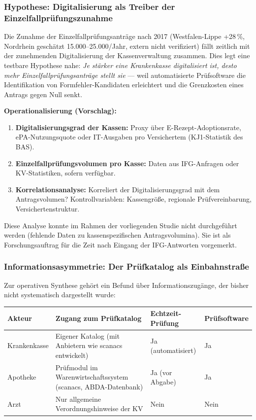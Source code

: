 \documentclass{umbruch-position}
\begin{document}
\subsubsection{Hypothese: Digitalisierung als Treiber der Einzelfallprüfungszunahme}

Die Zunahme der Einzelfallpr\"ufungsantr\"age nach 2017 (Westfalen-Lippe +28\,\%, Nordrhein gesch\"atzt 15.000--25.000/Jahr, extern nicht verifiziert) fällt zeitlich mit der zunehmenden Digitalisierung der Kassenverwaltung zusammen. Dies legt eine testbare Hypothese nahe: \textit{Je stärker eine Krankenkasse digitalisiert ist, desto mehr Einzelfallprüfungsanträge stellt sie} --- weil automatisierte Prüfsoftware die Identifikation von Formfehler-Kandidaten erleichtert und die Grenzkosten eines Antrags gegen Null senkt.

\textbf{Operationalisierung (Vorschlag):}
\begin{enumerate}[nosep]
  \item \textbf{Digitalisierungsgrad der Kassen:} Proxy über E-Rezept-Adoptionsrate, ePA-Nutzungsquote oder IT-Ausgaben pro Versichertem (KJ1-Statistik des BAS).
  \item \textbf{Einzelfallprüfungsvolumen pro Kasse:} Daten aus IFG-Anfragen oder KV-Statistiken, sofern verfügbar.
  \item \textbf{Korrelationsanalyse:} Korreliert der Digitalisierungsgrad mit dem Antragsvolumen? Kontrollvariablen: Kassengröße, regionale Prüfvereinbarung, Versichertenstruktur.
\end{enumerate}

Diese Analyse konnte im Rahmen der vorliegenden Studie nicht durchgeführt werden (fehlende Daten zu kassenspezifischen Antragsvolumina). Sie ist als Forschungsauftrag für die Zeit nach Eingang der IFG-Antworten vorgemerkt.

\subsubsection{Informationsasymmetrie: Der Prüfkatalog als Einbahnstraße}
\label{sec:pruefkatalog}

Zur operativen Synthese gehört ein Befund über Informationszugänge, der bisher nicht systematisch dargestellt wurde:

{\small
\begin{tabularx}{\textwidth}{l X l l}
\toprule
\textbf{Akteur} & \textbf{Zugang zum Prüfkatalog} & \textbf{Echtzeit-Prüfung} & \textbf{Prüfsoftware} \\
\midrule
Krankenkasse & Eigener Katalog (mit Anbietern wie scanacs entwickelt) & Ja (automatisiert) & Ja \\
\addlinespace
Apotheke & Prüfmodul im Warenwirtschaftssystem (scanacs, ABDA-Datenbank) & Ja (vor Abgabe) & Ja \\
\addlinespace
Arzt & Nur allgemeine Verordnungshinweise der KV & Nein & Nein \\
\bottomrule
\end{tabularx}
}
\end{document}
